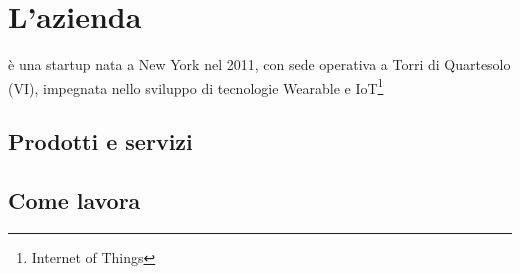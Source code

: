 \chapter{L'azienda\label{cap:lazienda}}
\nomeAziendaComm{} è una startup nata a New York nel 2011, con sede operativa a Torri di Quartesolo (VI), impegnata nello sviluppo di tecnologie Wearable e IoT\footnote{Internet of Things}

\section{Prodotti e servizi}

\section{Come lavora}

